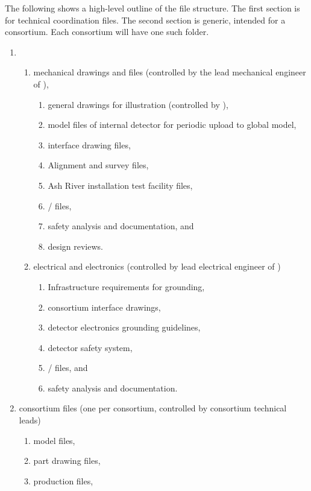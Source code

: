 The following shows a high-level outline of the file structure. The
first section is for technical coordination files. The second
section is generic, intended for a consortium. Each consortium will have one such
folder.
\begin{enumerate}
 \item {}
 \begin{enumerate}
  \item mechanical drawings and files (controlled by the lead mechanical engineer of ),
  \begin{enumerate}
    \item {} general drawings for illustration (controlled by ),
    \item \threed model files of internal detector for periodic upload to global model,
    \item \twod interface drawing files,    
    \item Alignment and survey files,
    \item Ash River installation test facility files,
    \item {}/ files,
    \item safety analysis and documentation, and
    \item design reviews.
  \end{enumerate}
  \item electrical and electronics (controlled by lead electrical engineer of )
  \begin{enumerate}
    \item Infrastructure requirements for grounding,
    \item consortium interface drawings,
    \item detector electronics grounding guidelines, 
    \item detector safety system,
    \item {}/ files, and
    \item safety analysis and documentation.
  \end{enumerate}
 \end{enumerate}
 \item consortium files (one per consortium, controlled by consortium technical leads)
 \begin{enumerate}
   \item \threed model files,
   \item \twod part drawing files,
   \item production files,

\end{enumerate}
\end{enumerate}
